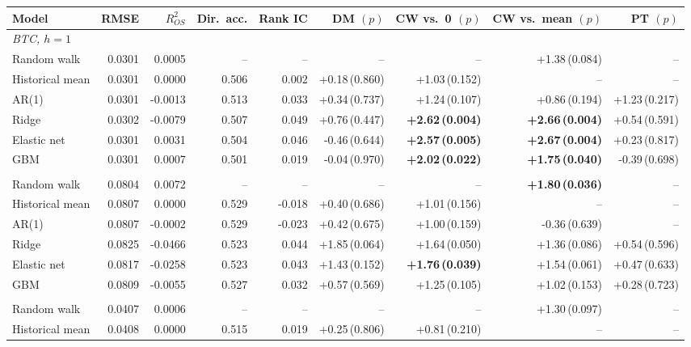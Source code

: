 \begin{tabular}{lrrrrrrrr}
\toprule
Model & RMSE & $R^2_{OS}$ & Dir.\ acc. & Rank IC & DM $(p)$ & CW vs.\ 0 $(p)$ & CW vs.\ mean $(p)$ & PT $(p)$ \\
\midrule
\multicolumn{9}{l}{\emph{BTC, $h=1$}} \\
\quad Random walk & 0.0301 & 0.0005 & -- & -- & -- & -- & +1.38\,(0.084) & -- \\
\quad Historical mean & 0.0301 & 0.0000 & 0.506 & 0.002 & +0.18\,(0.860) & +1.03\,(0.152) & -- & -- \\
\quad AR(1) & 0.0301 & -0.0013 & 0.513 & 0.033 & +0.34\,(0.737) & +1.24\,(0.107) & +0.86\,(0.194) & +1.23\,(0.217) \\
\quad Ridge & 0.0302 & -0.0079 & 0.507 & 0.049 & +0.76\,(0.447) & \textbf{+2.62\,(0.004)} & \textbf{+2.66\,(0.004)} & +0.54\,(0.591) \\
\quad Elastic net & 0.0301 & 0.0031 & 0.504 & 0.046 & -0.46\,(0.644) & \textbf{+2.57\,(0.005)} & \textbf{+2.67\,(0.004)} & +0.23\,(0.817) \\
\quad GBM & 0.0301 & 0.0007 & 0.501 & 0.019 & -0.04\,(0.970) & \textbf{+2.02\,(0.022)} & \textbf{+1.75\,(0.040)} & -0.39\,(0.698) \\
\addlinespace
\multicolumn{9}{l}{\emph{BTC, $h=7$}} \\
\quad Random walk & 0.0804 & 0.0072 & -- & -- & -- & -- & \textbf{+1.80\,(0.036)} & -- \\
\quad Historical mean & 0.0807 & 0.0000 & 0.529 & -0.018 & +0.40\,(0.686) & +1.01\,(0.156) & -- & -- \\
\quad AR(1) & 0.0807 & -0.0002 & 0.529 & -0.023 & +0.42\,(0.675) & +1.00\,(0.159) & -0.36\,(0.639) & -- \\
\quad Ridge & 0.0825 & -0.0466 & 0.523 & 0.044 & +1.85\,(0.064) & +1.64\,(0.050) & +1.36\,(0.086) & +0.54\,(0.596) \\
\quad Elastic net & 0.0817 & -0.0258 & 0.523 & 0.043 & +1.43\,(0.152) & \textbf{+1.76\,(0.039)} & +1.54\,(0.061) & +0.47\,(0.633) \\
\quad GBM & 0.0809 & -0.0055 & 0.527 & 0.032 & +0.57\,(0.569) & +1.25\,(0.105) & +1.02\,(0.153) & +0.28\,(0.723) \\
\addlinespace
\multicolumn{9}{l}{\emph{ETH, $h=1$}} \\
\quad Random walk & 0.0407 & 0.0006 & -- & -- & -- & -- & +1.30\,(0.097) & -- \\
\quad Historical mean & 0.0408 & 0.0000 & 0.515 & 0.019 & +0.25\,(0.806) & +0.81\,(0.210) & -- & -- \\

\end{tabular}
